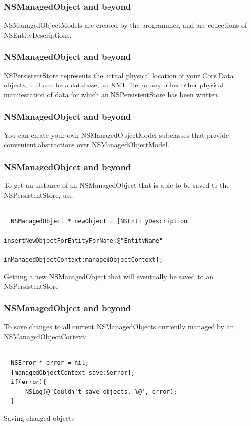 \documentclass[10pt]{beamer}
\begin{document}
\begin{frame}[fragile]
  \frametitle{NSManagedObject and beyond}
  NSManagedObjectModels are created by the programmer, and are collections of NSEntityDescriptions.

\end{frame}

\begin{frame}[fragile]
  \frametitle{NSManagedObject and beyond}
  NSPersistentStore represents the actual physical location of your Core Data objects, and can be a database, an XML file, or any other other physical manifestation of data for which an NSPersistentStore has been written.

\end{frame}

\begin{frame}[fragile]
  \frametitle{NSManagedObject and beyond}
  You can create your own NSManagedObjectModel subclasses that provide convenient abstractions over NSManagedObjectModel.

\end{frame}

\begin{frame}[fragile]
  \frametitle{NSManagedObject and beyond}
  To get an instance of an NSManagedObject that is able to be saved to the NSPersistentStore, use:
\begin{listing}[H]
    \begin{verbatim}

  NSManagedObject * newObject = [NSEntityDescription
                                 insertNewObjectForEntityForName:@"EntityName"
                                 inManagedObjectContext:managedObjectContext];

  \end{verbatim}
    \caption{Getting a new NSManagedObject that will eventually be saved to an NSPersistentStore}
    \label{listing:39}
  \end{listing}

\end{frame}

\begin{frame}[fragile]
  \frametitle{NSManagedObject and beyond}
  To save changes to all current NSManagedObjects currently managed by an NSManagedObjectContext:
\begin{listing}[H]
    \begin{verbatim}

  NSError * error = nil;
  [managedObjectContext save:&error];
  if(error){
      NSLog(@"Couldn't save objects, %@", error);
  } 

  \end{verbatim}
    \caption{Saving changed objects}
    \label{listing:40}
  \end{listing}

\end{frame}
\end{document}

